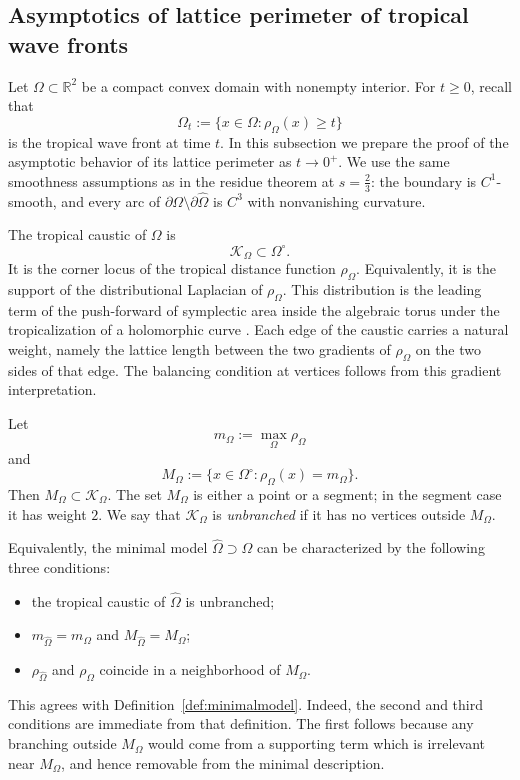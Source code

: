 \documentclass[a4paper,american,11pt]{amsart}
\theoremstyle{plain}
\theoremstyle{definition}
\newcommand{\R}{\mathbb R}
\begin{document}
\subsection{Asymptotics of lattice perimeter of tropical wave fronts}
\label{ssec:pertwf}

Let \(\Omega\subset\R^2\) be a compact convex domain with nonempty interior.
For \(t\ge0\), recall that
\[
\Omega_t:=\{x\in\Omega:\rho_\Omega(x)\ge t\}
\]
is the tropical wave front at time \(t\).  In this subsection we prepare the
proof of the asymptotic behavior of its lattice perimeter as \(t\to0^+\).  We
use the same smoothness assumptions as in the residue theorem at
\(s=\frac23\): the boundary is \(C^1\)-smooth, and every arc of
\(\partial\Omega\setminus\partial\widehat\Omega\) is \(C^3\) with
nonvanishing curvature.

The tropical caustic of \(\Omega\) is
\[
\mathcal K_\Omega\subset \Omega^\circ.
\]
It is the corner locus of the tropical distance function \(\rho_\Omega\).
Equivalently, it is the support of the distributional Laplacian of
\(\rho_\Omega\).  This distribution is the leading term of the push-forward
of symplectic area inside the algebraic torus under the tropicalization of a
holomorphic curve \cite{KalininShkolnikov2018IntroductionTropicalSeries}.
Each edge of the caustic carries a natural weight, namely the lattice length
between the two gradients of \(\rho_\Omega\) on the two sides of that edge.
The balancing condition at vertices follows from this gradient interpretation.

Let
\[
m_\Omega:=\max_{\Omega}\rho_\Omega
\]
and
\[
M_\Omega:=\{x\in \Omega^\circ:\rho_\Omega(x)=m_\Omega\}.
\]
Then \(M_\Omega\subset \mathcal K_\Omega\).  The set \(M_\Omega\) is either a
point or a segment; in the segment case it has weight \(2\).  We say that
\(\mathcal K_\Omega\) is \emph{unbranched} if it has no vertices outside
\(M_\Omega\).

Equivalently, the minimal model \(\widehat\Omega\supset\Omega\) can be
characterized by the following three conditions:
\begin{itemize}
\item the tropical caustic of \(\widehat\Omega\) is unbranched;
\item \(m_{\widehat\Omega}=m_\Omega\) and
\(M_{\widehat\Omega}=M_\Omega\);
\item \(\rho_{\widehat\Omega}\) and \(\rho_\Omega\) coincide in a neighborhood
of \(M_\Omega\).
\end{itemize}
This agrees with Definition~\ref{def:minimalmodel}.  Indeed, the second and
third conditions are immediate from that definition.  The first follows
because any branching outside \(M_\Omega\) would come from a supporting term
which is irrelevant near \(M_\Omega\), and hence removable from the minimal
description.
\end{document}
